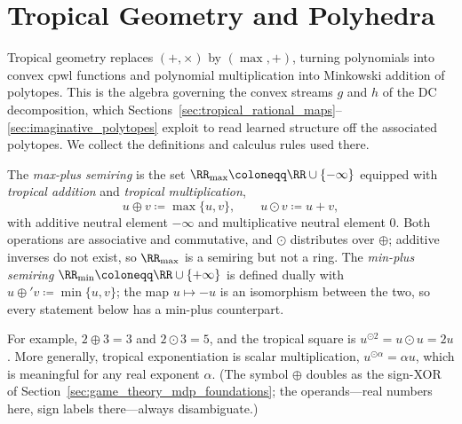 \section{Tropical Geometry and Polyhedra}\label{sec:tropical_polyhedra_foundations}

Tropical geometry replaces $(+, \times)$ by $(\max, +)$, turning polynomials into convex \ac{cpwl} functions and polynomial multiplication into Minkowski addition of polytopes. This is the algebra governing the convex streams $g$ and $h$ of the DC decomposition, which Sections~\ref{sec:tropical_rational_maps}--\ref{sec:imaginative_polytopes} exploit to read learned structure off the associated polytopes. We collect the definitions and calculus rules used there.

\begin{definition}\label{def:maxplus_semiring}
The \emph{max-plus semiring} is the set $\RR_{\max} \coloneqq \RR \cup \{-\infty\}$ equipped with \emph{tropical addition} and \emph{tropical multiplication},
\begin{equation}
	u \oplus v \coloneqq \max\{u, v\},
	\qquad
	u \odot v \coloneqq u + v,
	\label{eq:tropical_operations}
\end{equation}
with additive neutral element $-\infty$ and multiplicative neutral element $0$. Both operations are associative and commutative, and $\odot$ distributes over $\oplus$; additive inverses do not exist, so $\RR_{\max}$ is a semiring but not a ring. The \emph{min-plus semiring} $\RR_{\min} \coloneqq \RR \cup \{+\infty\}$ is defined dually with $u \oplus' v \coloneqq \min\{u,v\}$; the map $u \mapsto -u$ is an isomorphism between the two, so every statement below has a min-plus counterpart.
\end{definition}

For example, $2 \oplus 3 = 3$ and $2 \odot 3 = 5$, and the tropical square is $u^{\odot 2} = u \odot u = 2u$. More generally, tropical exponentiation is scalar multiplication, $u^{\odot \alpha} = \alpha u$, which is meaningful for any real exponent $\alpha$. (The symbol $\oplus$ doubles as the sign-XOR of Section~\ref{sec:game_theory_mdp_foundations}; the operands---real numbers here, sign labels there---always disambiguate.)

